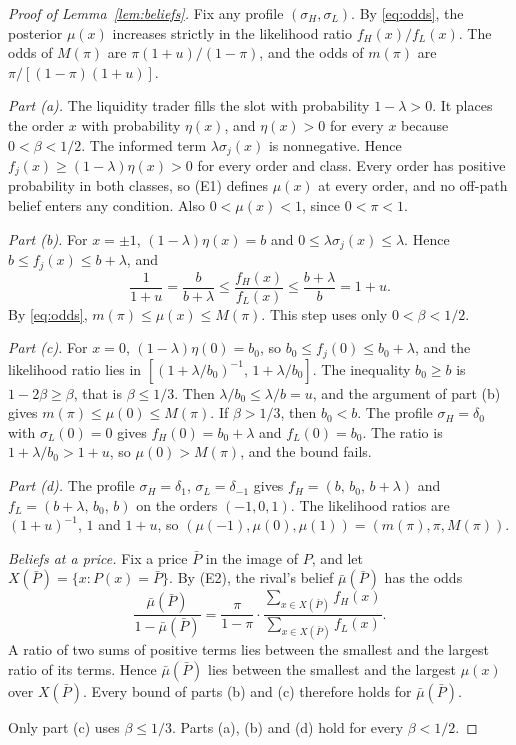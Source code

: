 \begin{proof}[Proof of Lemma~\ref{lem:beliefs}]
Fix any profile \((\sigma_H,\sigma_L)\). By \eqref{eq:odds}, the posterior \(\mu(x)\) increases strictly in the
likelihood ratio \(f_H(x)/f_L(x)\). The odds of \(M(\pi)\) are \(\pi(1+u)/(1-\pi)\), and the odds of \(m(\pi)\) are
\(\pi/[(1-\pi)(1+u)]\).

\emph{Part (a).} The liquidity trader fills the slot with probability \(1-\lambda>0\). It places the order \(x\)
with probability \(\eta(x)\), and \(\eta(x)>0\) for every \(x\) because \(0<\beta<1/2\). The informed term
\(\lambda\sigma_j(x)\) is nonnegative. Hence \(f_j(x)\ge(1-\lambda)\eta(x)>0\) for every order and class. Every
order has positive probability in both classes, so (E1) defines \(\mu(x)\) at every order, and no off-path belief
enters any condition. Also \(0<\mu(x)<1\), since \(0<\pi<1\).

\emph{Part (b).} For \(x=\pm1\), \((1-\lambda)\eta(x)=b\) and \(0\le\lambda\sigma_j(x)\le\lambda\). Hence
\(b\le f_j(x)\le b+\lambda\), and
\[
\frac1{1+u}=\frac{b}{b+\lambda}\le\frac{f_H(x)}{f_L(x)}\le\frac{b+\lambda}{b}=1+u .
\]
By \eqref{eq:odds}, \(m(\pi)\le\mu(x)\le M(\pi)\). This step uses only \(0<\beta<1/2\).

\emph{Part (c).} For \(x=0\), \((1-\lambda)\eta(0)=b_0\), so \(b_0\le f_j(0)\le b_0+\lambda\), and the likelihood
ratio lies in \([(1+\lambda/b_0)^{-1},\,1+\lambda/b_0]\). The inequality \(b_0\ge b\) is \(1-2\beta\ge\beta\), that
is \(\beta\le1/3\). Then \(\lambda/b_0\le\lambda/b=u\), and the argument of part (b) gives
\(m(\pi)\le\mu(0)\le M(\pi)\). If \(\beta>1/3\), then \(b_0<b\). The profile \(\sigma_H=\delta_0\) with
\(\sigma_L(0)=0\) gives \(f_H(0)=b_0+\lambda\) and \(f_L(0)=b_0\). The ratio is \(1+\lambda/b_0>1+u\), so
\(\mu(0)>M(\pi)\), and the bound fails.

\emph{Part (d).} The profile \(\sigma_H=\delta_1\), \(\sigma_L=\delta_{-1}\) gives \(f_H=(b,\,b_0,\,b+\lambda)\) and
\(f_L=(b+\lambda,\,b_0,\,b)\) on the orders \((-1,0,1)\). The likelihood ratios are \((1+u)^{-1}\), \(1\) and
\(1+u\), so \((\mu(-1),\mu(0),\mu(1))=(m(\pi),\pi,M(\pi))\).

\emph{Beliefs at a price.} Fix a price \(\bar P\) in the image of \(P\), and let \(X(\bar P)=\{x:P(x)=\bar P\}\).
By (E2), the rival's belief \(\bar\mu(\bar P)\) has the odds
\[
\frac{\bar\mu(\bar P)}{1-\bar\mu(\bar P)}=\frac{\pi}{1-\pi}\cdot
\frac{\sum_{x\in X(\bar P)}f_H(x)}{\sum_{x\in X(\bar P)}f_L(x)} .
\]
A ratio of two sums of positive terms lies between the smallest and the largest ratio of its terms. Hence
\(\bar\mu(\bar P)\) lies between the smallest and the largest \(\mu(x)\) over \(X(\bar P)\). Every bound of parts (b)
and (c) therefore holds for \(\bar\mu(\bar P)\).

Only part (c) uses \(\beta\le1/3\). Parts (a), (b) and (d) hold for every \(\beta<1/2\).
\end{proof}

